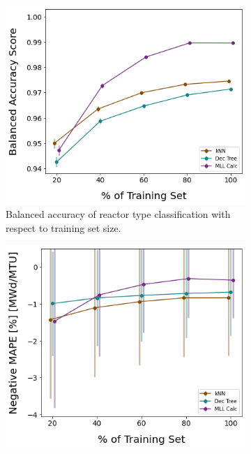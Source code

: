\begin{figure}[!htb]
  \centering
  \begin{subfigure}[b]{0.49\textwidth}
    \centering
    \includegraphics[width=\textwidth]{./chapters/exp1/learncurve_nuc29_err05_BalAcc_rxtr.png}
    \caption{Balanced accuracy of reactor type classification with respect 
             to training set size.}
    \label{fig:learnsA}
  \end{subfigure}
  \hfill
  \begin{subfigure}[b]{0.49\textwidth}
    \centering
    \includegraphics[width=\textwidth]{./chapters/exp1/learncurve_nuc29_err05_MAPE_burn.png}

\end{subfigure}
\end{figure}
